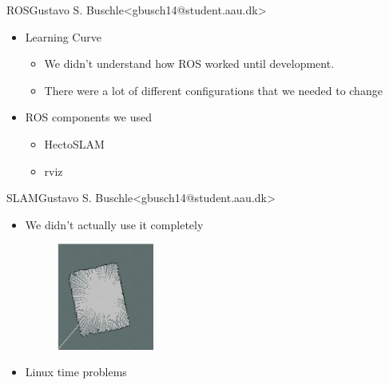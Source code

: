 \begin{frame}{ROS}{Gustavo S. Buschle\newline<gbusch14@student.aau.dk>}
    \begin{itemize}
        \item <1-> Learning Curve
            \begin{itemize}
                \item <1-> We didn't understand how ROS worked until development.
                \item <2-> There were a lot of different configurations that we needed to change
            \end{itemize}
        \item <3-> ROS components we used
            \begin{itemize}
                \item <3-> HectoSLAM
                \item <4-> rviz
            \end{itemize}
    \end{itemize}
\end{frame}

\begin{frame}{SLAM}{Gustavo S. Buschle\newline<gbusch14@student.aau.dk>}
    \begin{itemize}
        \item <1-> We didn't actually use it completely
        \begin{figure}[h!]
            \includegraphics[width=0.3\textwidth]{images/hector.png}
        \end{figure}
        \item <2-> Linux time problems
    \end{itemize}
\end{frame}
